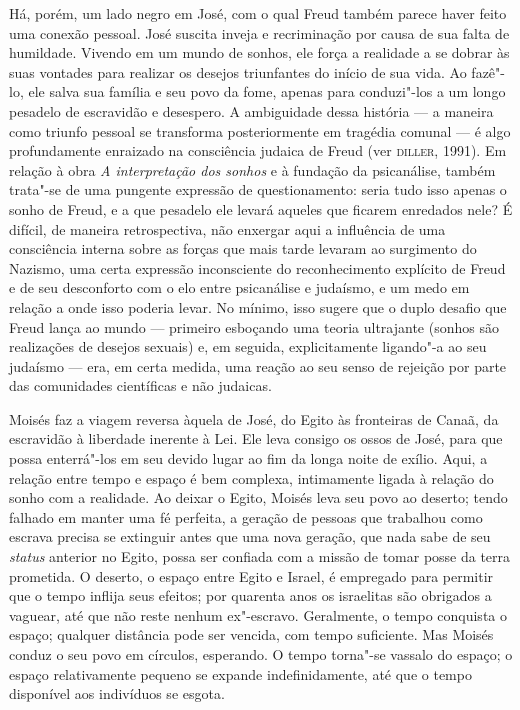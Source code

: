 Há, porém, um lado negro em José, com o qual Freud também parece haver
feito uma conexão pessoal. José suscita inveja e recriminação por causa
de sua falta de humildade. Vivendo em um mundo de sonhos, ele força a
realidade a se dobrar às suas vontades para realizar os desejos
triunfantes do início de sua vida. Ao fazê"-lo, ele salva sua família e
seu povo da fome, apenas para conduzi"-los a um longo pesadelo de
escravidão e desespero. A ambiguidade dessa história --- a maneira como
triunfo pessoal se transforma posteriormente em tragédia comunal --- é
algo profundamente enraizado na consciência judaica de Freud (ver
\textsc{diller}, 1991). Em relação à obra \emph{A interpretação dos sonhos} e à
fundação da psicanálise, também trata"-se de uma pungente expressão de
questionamento: seria tudo isso apenas o sonho de Freud, e a que
pesadelo ele levará aqueles que ficarem enredados nele? É difícil, de
maneira retrospectiva, não enxergar aqui a influência de uma consciência
interna sobre as forças que mais tarde levaram ao surgimento do Nazismo,
uma certa expressão inconsciente do reconhecimento explícito de Freud e
de seu desconforto com o elo entre psicanálise e judaísmo, e um medo em
relação a onde isso poderia levar. No mínimo, isso sugere que o duplo
desafio que Freud lança ao mundo --- primeiro esboçando uma teoria
ultrajante (sonhos são realizações de desejos sexuais) e, em seguida,
explicitamente ligando"-a ao seu judaísmo --- era, em certa medida, uma
reação ao seu senso de rejeição por parte das comunidades científicas e
não judaicas.

Moisés faz a viagem reversa àquela de José, do Egito às fronteiras de
Canaã, da escravidão à liberdade inerente à Lei. Ele leva consigo os
ossos de José, para que possa enterrá"-los em seu devido lugar ao fim da
longa noite de exílio. Aqui, a relação entre tempo e espaço é bem
complexa, intimamente ligada à relação do sonho com a realidade. Ao
deixar o Egito, Moisés leva seu povo ao deserto; tendo falhado em manter
uma fé perfeita, a geração de pessoas que trabalhou como escrava precisa
se extinguir antes que uma nova geração, que nada sabe de seu
\emph{status} anterior no Egito, possa ser confiada com a missão de
tomar posse da terra prometida. O deserto, o espaço entre Egito e
Israel, é empregado para permitir que o tempo inflija seus efeitos; por
quarenta anos os israelitas são obrigados a vaguear, até que não reste
nenhum ex"-escravo. Geralmente, o tempo conquista o espaço; qualquer
distância pode ser vencida, com tempo suficiente. Mas Moisés conduz o
seu povo em círculos, esperando. O tempo torna"-se vassalo do espaço; o
espaço relativamente pequeno se expande indefinidamente, até que o tempo
disponível aos indivíduos se esgota.

